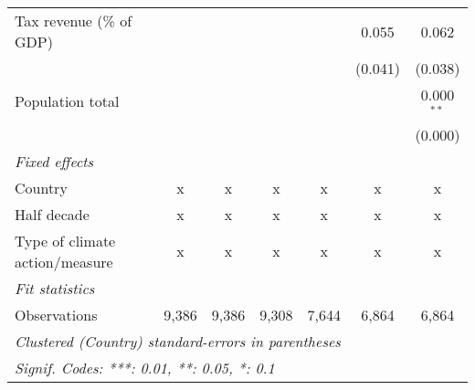 \begin{tabular}{lcccccc}
   Tax revenue (\% of GDP)                      &         &         &               &              & 0.055        & 0.062\\   
                                                &         &         &               &              & (0.041)      & (0.038)\\   
   Population total                             &         &         &               &              &              & 0.000$^{**}$\\   
                                                &         &         &               &              &              & (0.000)\\   
   \emph{Fixed effects}\\
   Country                                      & x       & x       & x             & x            & x            & x\\  
   Half decade                                  & x       & x       & x             & x            & x            & x\\  
   Type of climate action/measure               & x       & x       & x             & x            & x            & x\\  
   \midrule \emph{Fit statistics}\\
   Observations                                 & 9,386   & 9,386   & 9,308         & 7,644        & 6,864        & 6,864\\  
   \midrule
   \multicolumn{7}{l}{\emph{Clustered (Country) standard-errors in parentheses}}\\
   \multicolumn{7}{l}{\emph{Signif. Codes: ***: 0.01, **: 0.05, *: 0.1}}\\
\end{tabular}
\par\endgroup


